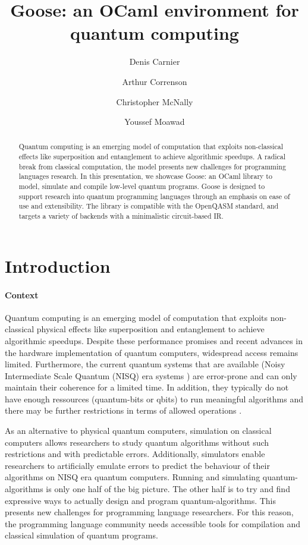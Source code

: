 \documentclass[a4paper]{easychair}
\title{Goose: an OCaml environment for quantum computing}
\author{
  Denis Carnier\inst{1}
  \and
  Arthur Correnson\inst{2}
  \and
  Christopher McNally\inst{3}
  \and
  Youssef Moawad\inst{4}
}
\institute{
  imec-DistriNet, KU Leuven
\and
  Ecole Normale Sup\'erieure de Rennes
\and
  Massachusetts Institute of Technology
\and
  University of Glasgow
}
\begin{document}
\maketitle

\begin{abstract}
Quantum computing is an emerging model of computation that exploits non-classical effects like superposition and entanglement to achieve algorithmic speedups. A radical break from classical computation, the model presents new challenges for programming languages research. In this presentation, we showcase Goose: an OCaml library to model, simulate and compile low-level quantum programs. Goose is designed to support research into quantum programming languages through an emphasis on ease of use and extensibility. The library is compatible with the OpenQASM standard, and targets a variety of backends with a minimalistic circuit-based IR.
\end{abstract}

\section{Introduction}

\paragraph*{Context}

Quantum computing \cite{Chuang2010} is an emerging model of computation that exploits non-classical physical effects like superposition and entanglement to achieve algorithmic speedups. Despite these performance promises and recent advances in the hardware implementation of quantum computers, widespread access remains limited. Furthermore, the current quantum systems that are available (Noisy Intermediate Scale Quantum (NISQ) era systems \cite{Preskill2018}) are error-prone and can only maintain their coherence for a limited time. In addition, they typically do not have enough ressources (quantum-bits or qbits) to run meaningful algorithms and there may be further restrictions in terms of allowed operations \cite{Gyongyosi2019}.

As an alternative to physical quantum computers, simulation on classical computers allows researchers to study quantum algorithms without such restrictions and with predictable errors. Additionally, simulators enable researchers to artificially emulate errors to predict the behaviour of their algorithms on NISQ era quantum computers. Running and simulating quantum-algorithms is only one half of the big picture. The other half is to try and find expressive ways to actually design and program quantum-algorithms. This presents new challenges for programming language researchers. For this reason, the programming language community needs accessible tools for compilation and classical simulation of quantum programs.
\end{document}
